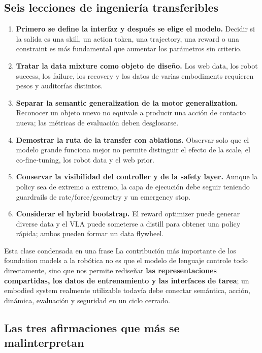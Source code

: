 \documentclass[a4paper]{article}
\begin{document}
\subsection{Seis lecciones de ingeniería transferibles}

\begin{enumerate}
  \item \textbf{Primero se define la interfaz y después se elige el modelo.} Decidir si la salida es una skill, un action token, una trajectory, una reward o una constraint es más fundamental que aumentar los parámetros sin criterio.
  \item \textbf{Tratar la data mixture como objeto de diseño.} Los web data, los robot success, los failure, los recovery y los datos de varias embodiments requieren pesos y auditorías distintos.
  \item \textbf{Separar la semantic generalization de la motor generalization.} Reconocer un objeto nuevo no equivale a producir una acción de contacto nueva; las métricas de evaluación deben desglosarse.
  \item \textbf{Demostrar la ruta de la transfer con ablations.} Observar solo que el modelo grande funciona mejor no permite distinguir el efecto de la scale, el co-fine-tuning, los robot data y el web prior.
  \item \textbf{Conservar la visibilidad del controller y de la safety layer.} Aunque la policy sea de extremo a extremo, la capa de ejecución debe seguir teniendo guardrails de rate/force/geometry y un emergency stop.
  \item \textbf{Considerar el hybrid bootstrap.} El reward optimizer puede generar diverse data y el VLA puede someterse a distill para obtener una policy rápida; ambos pueden formar un data flywheel.
\end{enumerate}

\begin{importantbox}{Esta clase condensada en una frase}
La contribución más importante de los foundation models a la robótica no es que el modelo de lenguaje controle todo directamente, sino que nos permite rediseñar \textbf{las representaciones compartidas, los datos de entrenamiento y las interfaces de tarea}; un embodied system realmente utilizable todavía debe conectar semántica, acción, dinámica, evaluación y seguridad en un ciclo cerrado.
\end{importantbox}

\subsection{Las tres afirmaciones que más se malinterpretan}
\end{document}
